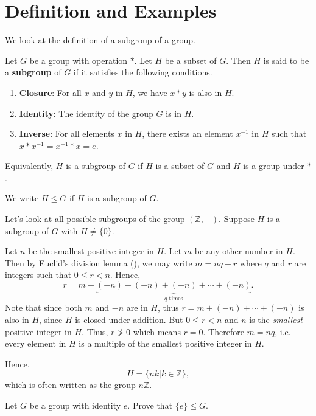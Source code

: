 \section{Definition and Examples}
We look at the definition of a subgroup of a group.
\begin{definition}
    Let $G$ be a group with operation $\ast$. Let $H$ be a subset of $G$. Then $H$ is said to be a \textbf{subgroup} of $G$ if it satisfies the following conditions.
    \begin{enumerate}
        \item \textbf{Closure}: For all $x$ and $y$ in $H$, we have $x \ast y$ is also in $H$.
        \item \textbf{Identity}: The identity of the group $G$ is in $H$.
        \item \textbf{Inverse}: For all elements $x$ in $H$, there exists an element $x^{-1}$ in $H$ such that $x \ast x^{-1} = x^{-1} \ast x = e$.
    \end{enumerate}
\end{definition}
\begin{remark}
    Equivalently, $H$ is a subgroup of $G$ if $H$ is a subset of $G$ and $H$ is a group under $\ast$.
\end{remark}
We write $H \leq G$ if $H$ is a subgroup of $G$.

\begin{example}
    Let's look at all possible subgroups of the group $(\mathbb{Z}, +)$. Suppose $H$ is a subgroup of $G$ with $H \neq \{0\}$.

    Let $n$ be the smallest positive integer in $H$. Let $m$ be any other number in $H$. Then by Euclid's division lemma (), we may write $m = nq + r$ where $q$ and $r$ are integers such that $0 \leq r < n$. Hence,
    \[
        r = m + \underbrace{(-n) +(-n) +(-n) + \cdots + (-n)}_{q\text{ times}}.
    \]
    Note that since both $m$ and $-n$ are in $H$, thus $r = m + (-n) + \cdots + (-n)$ is also in $H$, since $H$ is closed under addition. But $0 \leq r < n$ and $n$ is the \textit{smallest} positive integer in $H$. Thus, $r \not> 0$ which means $r = 0$. Therefore $m = nq$, i.e. every element in $H$ is a multiple of the smallest positive integer in $H$.

    Hence,
    \[
    H = \{nk \vert k \in \mathbb{Z}\},
    \]
    which is often written as the group $n\mathbb{Z}$.
\end{example}

\begin{exercise}
    Let $G$ be a group with identity $e$. Prove that $\{e\} \leq G$.
\end{exercise}

